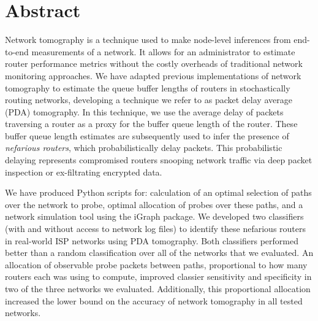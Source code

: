 \chapter*{Abstract}
\vspace{-1em}
Network tomography is a technique used to make node-level inferences from end-to-end measurements of a network. It allows for an administrator to estimate router performance metrics without the costly overheads of traditional network monitoring approaches. We have adapted previous implementations of network tomography to estimate the queue buffer lengths of routers in stochastically routing networks, developing a technique we refer to as packet delay average (PDA) tomography. In this technique, we use the average delay of packets traversing a router as a proxy for the buffer queue length of the router. These buffer queue length estimates are subsequently used to infer the presence of \textit{nefarious routers}, which probabilistically delay packets. This probabilistic delaying represents compromised routers snooping network traffic via deep packet inspection or ex-filtrating encrypted data.\par
We have produced Python scripts for: calculation of an optimal selection of paths over the network to probe, optimal allocation of probes over these paths, and a network simulation tool using the iGraph package. We developed two classifiers (with and without access to network log files) to identify these nefarious routers in real-world ISP networks using PDA tomography. Both classifiers performed better than a random classification over all of the networks that we evaluated. An allocation of observable probe packets between paths, proportional to how many routers each was using to compute, improved classier sensitivity and specificity in two of the three networks we evaluated. Additionally, this proportional allocation increased the lower bound on the accuracy of network tomography in all tested networks.